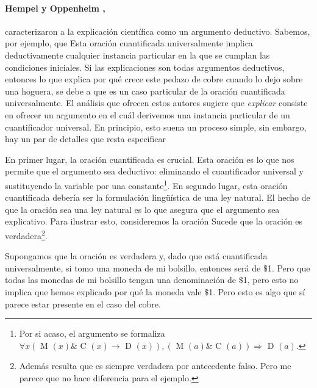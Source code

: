 \paragraph{Hempel y Oppenheim \citeyear{Hempel1948},}
caracterizaron  a la explicación científica como un
argumento deductivo.  Sabemos, por ejemplo, que 
Esta oración cuantificada universalmente implica
deductivamente cualquier instancia particular en la
que se cumplan las condiciones iniciales. Si las
explicaciones son todas argumentos deductivos, entonces
lo que explica por qué crece este pedazo de cobre
cuando lo dejo sobre una hoguera, se debe a que es un
caso particular de la oración cuantificada
universalmente. El análisis que ofrecen estos autores
sugiere que \emph{explicar} consiste en ofrecer un
argumento en el cuál derivemos una instancia
particular de un cuantificador universal. En
principio, esto suena un proceso simple, sin embargo,
hay un par de detalles que resta especificar

En primer lugar, la oración cuantificada es crucial.
Esta oración es lo que nos permite que el argumento
sea deductivo: eliminando el cuantificador universal y
sustituyendo la variable por una constante\footnote{
	Por si acaso, el argumento se formaliza
	$ \forall{ x }( \text{ M }( x ) \& \text{ C }( x )
	\rightarrow \text{ D }( x ) ), ( \text{ M }( a )
	\& \text{ C }( a ) ) \Rightarrow \text{ D }( a ) $.
}.
En segundo lugar, esta oración cuantificada debería
ser la formulación lingüística de una ley natural. El
hecho de que la oración sea una ley natural es lo que
asegura que el argumento sea explicativo. Para
ilustrar esto, consideremos la oración  Sucede que la oración es verdadera\footnote{
    Además resulta que es siempre verdadera por
    antecedente falso. Pero me parece que no hace
    diferencia para el ejemplo.
}.

Supongamos que la oración es verdadera y, dado que
está cuantificada  universalmente, si tomo una moneda
de mi bolsillo, entonces será de $ \$ $1. Pero que todas
las monedas de mi bolsillo tengan una denominación de
$ \$ $1, pero esto no implica que hemos explicado por qué
la moneda vale $ \$ $1. Pero esto es algo que sí parece
estar presente en el caso del cobre.

